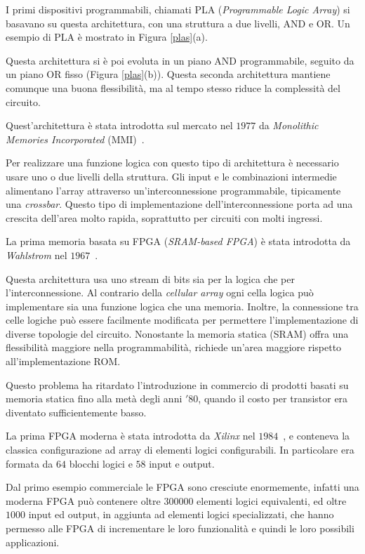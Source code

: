 I primi dispositivi programmabili, chiamati PLA (\textit{Programmable Logic Array}) si basavano su questa architettura, con una struttura a due livelli, AND e OR. Un esempio di PLA è mostrato in Figura \ref{plas}(a).

Questa architettura si è poi evoluta in un piano AND programmabile, seguito da un piano OR fisso (Figura \ref{plas}(b)). Questa seconda architettura mantiene comunque una buona flessibilità, ma al tempo stesso riduce la complessità del circuito.

Quest'architettura è stata introdotta sul mercato nel $1977$ da \textit{Monolithic Memories Incorporated} (MMI)~\cite{birkner1978programmable}.

Per realizzare una funzione logica con questo tipo di architettura è necessario usare uno o due livelli della struttura. Gli input e le combinazioni intermedie alimentano l'array attraverso un'interconnessione programmabile, tipicamente una \textit{crossbar}. Questo tipo di implementazione dell'interconnessione porta ad una crescita dell'area molto rapida, soprattutto per circuiti con molti ingressi.

La prima memoria basata su FPGA (\textit{SRAM-based FPGA}) è stata introdotta da \textit{Wahlstrom} nel $1967$~\cite{wahl}. 

Questa architettura usa uno stream di bits sia per la logica che per l'interconnessione. Al contrario della \textit{cellular array} ogni cella logica può implementare sia una funzione logica che una memoria. Inoltre, la connessione tra celle logiche può essere facilmente modificata per permettere l'implementazione di diverse topologie del circuito. Nonostante la memoria statica (SRAM) offra una flessibilità maggiore nella programmabilità, richiede un'area maggiore rispetto all'implementazione ROM.

Questo problema ha ritardato l'introduzione in commercio di prodotti basati su memoria statica fino alla metà degli anni $'80$, quando il costo per transistor era diventato sufficientemente basso.

La prima FPGA moderna è stata introdotta da \textit{Xilinx} nel $1984$~\cite{reconfgate}, e conteneva la classica configurazione ad array di elementi logici configurabili. In particolare era formata da $64$ blocchi logici e $58$ input e output. 

Dal primo esempio commerciale le FPGA sono cresciute enormemente, infatti una moderna FPGA può contenere oltre $300000$ elementi logici equivalenti, ed oltre $1000$ input ed output, in aggiunta ad elementi logici specializzati, che hanno permesso alle FPGA di incrementare le loro funzionalità e quindi le loro possibili applicazioni.

